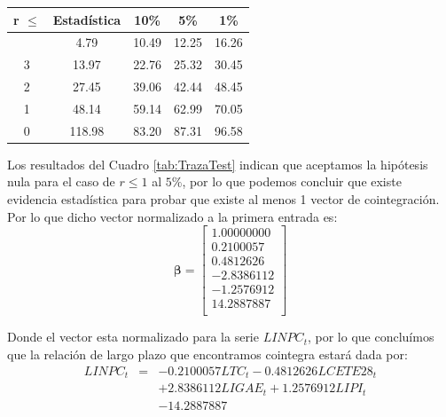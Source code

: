 \documentclass[
]{book}
\begin{document}
\begin{longtable}[]{@{}ccccc@{}}
\toprule\noalign{}
r \(\leq\) & Estadística & 10\% & 5\% & 1\% \\
\midrule\noalign{}
\endhead
\bottomrule\noalign{}
\endlastfoot
4 & 4.79 & 10.49 & 12.25 & 16.26 \\
3 & 13.97 & 22.76 & 25.32 & 30.45 \\
2 & 27.45 & 39.06 & 42.44 & 48.45 \\
1 & 48.14 & 59.14 & 62.99 & 70.05 \\
0 & 118.98 & 83.20 & 87.31 & 96.58 \\
\end{longtable}

Los resultados del Cuadro \ref{tab:TrazaTest} indican que aceptamos la
hipótesis nula para el caso de \(r \leq 1\) al \(5\%\), por lo que podemos
concluir que existe evidencia estadística para probar que existe al
menos 1 vector de cointegración. Por lo que dicho vector normalizado a
la primera entrada es: \begin{equation}
    \boldsymbol{\beta} = \left[ 
    \begin{matrix}
    1.00000000 \\
    0.2100057 \\
    0.4812626 \\
    -2.8386112 \\
    -1.2576912 \\
    14.2887887 \\
    \end{matrix} \right]
\end{equation}

Donde el vector esta normalizado para la serie \(LINPC_t\), por lo que
concluímos que la relación de largo plazo que encontramos cointegra
estará dada por: \begin{eqnarray*}
    LINPC_t & = & -0.2100057 LTC_t - 0.4812626 LCETE28_t \\
    &  & + 2.8386112 LIGAE_t + 1.2576912 LIPI_t \\
    &  & - 14.2887887
\end{eqnarray*}
\end{document}
